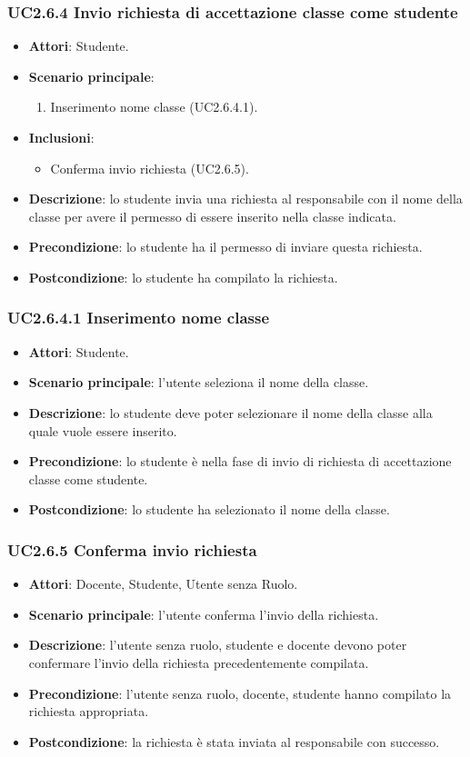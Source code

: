 \subsubsection{UC2.6.4 Invio richiesta di accettazione classe come studente}
\begin{itemize}
\item \textbf{Attori}: Studente.
\item \textbf{Scenario principale}:
\begin{enumerate}
\item Inserimento nome classe (UC2.6.4.1).
\end{enumerate}
\item \textbf{Inclusioni}:
\begin{itemize}
\item Conferma invio richiesta (UC2.6.5).
\end{itemize}
\item \textbf{Descrizione}: lo studente invia una richiesta al responsabile con il nome della classe per avere il permesso di essere inserito nella classe indicata.
\item \textbf{Precondizione}: lo studente ha il permesso di inviare questa richiesta.
\item \textbf{Postcondizione}: lo studente ha compilato la richiesta.
\end{itemize}
\subsubsection{UC2.6.4.1 Inserimento nome classe}
\begin{itemize}
\item \textbf{Attori}: Studente.
\item \textbf{Scenario principale}: l'utente seleziona il nome della classe.
\item \textbf{Descrizione}: lo studente deve poter selezionare il nome della classe alla quale vuole essere inserito.
\item \textbf{Precondizione}: lo studente è nella fase di invio di richiesta di accettazione classe come studente.
\item \textbf{Postcondizione}: lo studente ha selezionato il nome della classe.
\end{itemize}
\subsubsection{UC2.6.5 Conferma invio richiesta}
\begin{itemize}
\item \textbf{Attori}: Docente, Studente, Utente senza Ruolo.
\item \textbf{Scenario principale}: l'utente conferma l'invio della richiesta.
\item \textbf{Descrizione}: l'utente senza ruolo, studente e docente devono poter confermare l'invio della richiesta  precedentemente compilata.
\item \textbf{Precondizione}: l'utente senza ruolo, docente, studente hanno compilato la richiesta appropriata.
\item \textbf{Postcondizione}: la richiesta è stata inviata al responsabile con successo.
\end{itemize}
